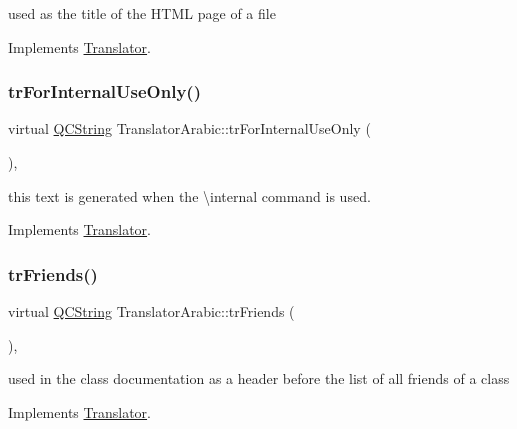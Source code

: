 used as the title of the H\+T\+ML page of a file 

Implements \mbox{\hyperlink{class_translator}{Translator}}.

\mbox{\label{class_translator_arabic_a18f11fe65de52452965f8b16974c144d}} 
\subsubsection{\texorpdfstring{trForInternalUseOnly()}{trForInternalUseOnly()}}
{\footnotesize\ttfamily virtual \mbox{\hyperlink{class_q_c_string}{Q\+C\+String}} Translator\+Arabic\+::tr\+For\+Internal\+Use\+Only (\begin{DoxyParamCaption}{ }\end{DoxyParamCaption})\hspace{0.3cm}{\ttfamily [inline]}, {\ttfamily [virtual]}}

this text is generated when the \textbackslash{}internal command is used. 

Implements \mbox{\hyperlink{class_translator}{Translator}}.

\mbox{\label{class_translator_arabic_a7e545f1ee3203efb6d593ef4134614e5}} 
\subsubsection{\texorpdfstring{trFriends()}{trFriends()}}
{\footnotesize\ttfamily virtual \mbox{\hyperlink{class_q_c_string}{Q\+C\+String}} Translator\+Arabic\+::tr\+Friends (\begin{DoxyParamCaption}{ }\end{DoxyParamCaption})\hspace{0.3cm}{\ttfamily [inline]}, {\ttfamily [virtual]}}

used in the class documentation as a header before the list of all friends of a class 

Implements \mbox{\hyperlink{class_translator}{Translator}}.

\mbox{\label{class_translator_arabic_a97ffd13d19b3b5d0e0dfdf8a4af2928e}} 
